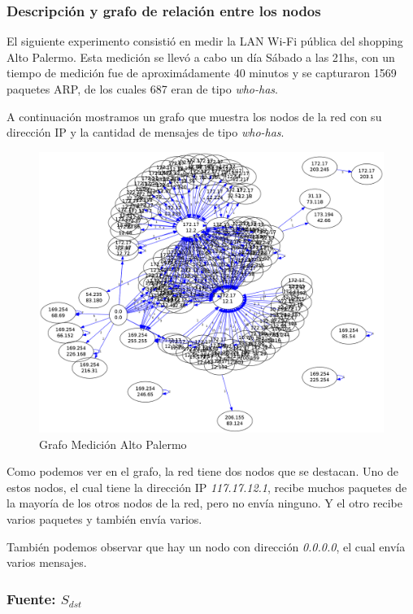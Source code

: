 \subsubsection{Descripción y grafo de relación entre los nodos}

El siguiente experimento consistió en medir la LAN Wi-Fi pública del shopping Alto Palermo. Esta medición se llevó a cabo un día Sábado a las 21hs, con un tiempo de medición fue de aproximádamente 40 minutos y se capturaron 1569 paquetes ARP, de los cuales 687 eran de tipo \emph{who-has}.

A continuación mostramos un grafo que muestra los nodos de la red con su dirección IP y la cantidad de mensajes de tipo \emph{who-has}.

\begin{figure}[H]
 \begin{center}
  \includegraphics[width=0.9\linewidth]{../imgs/red-alto-palermo_red.png}
  \caption{Grafo Medición Alto Palermo}
 \end{center}
\end{figure}

Como podemos ver en el grafo, la red tiene dos nodos que se destacan. Uno de estos nodos, el cual tiene la dirección IP \emph{117.17.12.1}, recibe muchos paquetes de la mayoría de los otros nodos de la red, pero no envía ninguno. Y el otro recibe varios paquetes y también envía varios.

También podemos observar que hay un nodo con dirección \emph{0.0.0.0}, el cual envía varios mensajes. %

\subsubsection{Fuente: $S_{dst}$}

